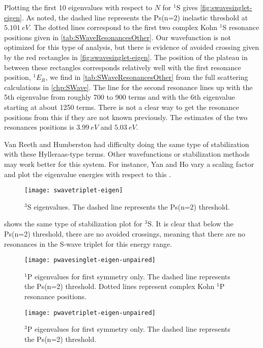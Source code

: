 \documentclass[Dissertation.tex]{subfiles}
\begin{document}
Plotting the first 10 eigenvalues with respect to $N$ for $^1$S gives \cref{fig:swavesinglet-eigen}. As noted, the dashed line represents the Ps(n=2) inelastic threshold at $\SI{5.101}{eV}$. The dotted lines correspond to the first two complex Kohn $^1$S resonance positions given in \cref{tab:SWaveResonancesOther}. Our wavefunction is not optimized for this type of analysis, but there is evidence of avoided crossing given by the red rectangles in \cref{fig:swavesinglet-eigen}. The position of the plateau in between these rectangles corresponds relatively well with the first resonance position, $^1E_R$, we find in \cref{tab:SWaveResonancesOther} from the full scattering calculations in \cref{chp:SWave}. The line for the second resonance lines up with the 5th eigenvalue from roughly 700 to 900 terms and with the 6th eigenvalue starting at about 1250 terms. There is not a clear way to get the resonance positions from this if they are not known previously. The estimates of the two resonances positions is $\SI{3.99}{eV}$ and $\SI{5.03}{eV}$.

Van Reeth and Humberston \cite{VanReeth2004} had difficulty doing the same type of stabilization with these Hylleraas-type terms. Other wavefunctions or stabilization methods may work better for this system. For instance, Yan and Ho vary a scaling factor and plot the eigenvalue energies with respect to this \cite{Yan2003}.

\begin{figure}[H]
	\centering
	\texttt{[image: swavetriplet-eigen]}
	\caption[$^3$S eigenvalues]{$^3$S eigenvalues. The dashed line represents the Ps(n=2) threshold.}
	\label{fig:swavetriplet-eigen}
\end{figure}

 shows the same type of stabilization plot for $^3$S. It is clear that below the Ps(n=2) threshold, there are no avoided crossings, meaning that there are no resonances in the S-wave triplet for this energy range. 

\begin{figure}[H]
	\centering
	\texttt{[image: pwavesinglet-eigen-unpaired]}
	\caption[$^1$P eigenvalues for first symmetry only]{$^1$P eigenvalues for first symmetry only. The dashed line represents the Ps(n=2) threshold. Dotted lines represent complex Kohn $^1$P resonance positions.}
	\label{fig:pwavesinglet-eigen-unpaired}
\end{figure}

\begin{figure}[H]
	\centering
	\texttt{[image: pwavetriplet-eigen-unpaired]}
	\caption[$^3$P eigenvalues for first symmetry only]{$^3$P eigenvalues for first symmetry only. The dashed line represents the Ps(n=2) threshold.}
	\label{fig:pwavetriplet-eigen-unpaired}
\end{figure}
\end{document}
